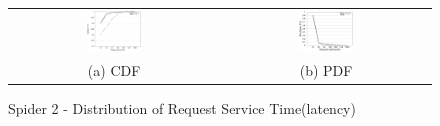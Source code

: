 \begin{figure}[!t]
\begin{center}
\begin{tabular}{cc}
\hspace*{-1cm}                                                           
{\includegraphics[width=0.27\textwidth]{./figs/spider2-reqLatCDF.eps}}&
\hspace{-2mm}
{\includegraphics[width=0.27\textwidth]{./figs/spider2-reqLatPDF.eps}}\\
\small (a) CDF & \small(b) PDF \\
\end{tabular}
\vspace{-0.1in}
\caption{Spider 2 - Distribution of Request Service Time(latency)}
\label{fig:spider1-reqLat} 
\end{center}
\end{figure}

